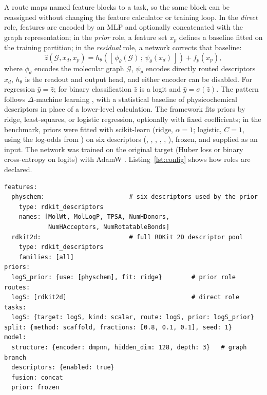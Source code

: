 A route maps named feature blocks to a task, so the same block can be reassigned without changing the feature calculator or training loop. In the \emph{direct} role, features are encoded by an MLP and optionally concatenated with the graph representation; in the \emph{prior} role, a feature set $x_p$ defines a baseline fitted on the training partition; in the \emph{residual} role, a network corrects that baseline:
\begin{equation}
    \hat{z}(\mathcal{G}, x_d, x_p) = h_\theta\!\left(\left[\,\phi_\theta(\mathcal{G})\,;\,\psi_\theta(x_d)\,\right]\right) + f_p(x_p),
    \label{eq:prior-residual}
\end{equation}
where $\phi_\theta$ encodes the molecular graph $\mathcal{G}$, $\psi_\theta$ encodes directly routed descriptors $x_d$, $h_\theta$ is the readout and output head, and either encoder can be disabled. For regression $\hat{y}=\hat{z}$; for binary classification $\hat{z}$ is a logit and $\hat{y}=\sigma(\hat{z})$. The pattern follows $\Delta$-machine learning \cite{ramakrishnan2015delta}, with a statistical baseline of physicochemical descriptors in place of a lower-level calculation. The framework fits priors by ridge, least-squares, or logistic regression, optionally with fixed coefficients; in the benchmark, priors were fitted with scikit-learn \cite{pedregosa2011sklearn} (ridge, $\alpha=1$; logistic, $C=1$, using the log-odds from ) on six descriptors (, , , , , ), frozen, and supplied as an input. The network was trained on the original target (Huber loss \cite{huber1964robust} or binary cross-entropy on logits) with AdamW \cite{loshchilov2019adamw}. Listing~\ref{lst:config} shows how roles are declared.

\begin{lstlisting}[float=t, caption={Configuration excerpt showing the three predictive roles in Eq.~\eqref{eq:prior-residual}. The excerpt is validated against the framework schema. Removing the task prior gives a direct hybrid, disabling the descriptor branch gives a prior and residual model, and setting the graph encoder to none gives a descriptor-only model.}, label={lst:config}]
features:
  physchem:                       # six descriptors used by the prior
    type: rdkit_descriptors
    names: [MolWt, MolLogP, TPSA, NumHDonors,
            NumHAcceptors, NumRotatableBonds]
  rdkit2d:                        # full RDKit 2D descriptor pool
    type: rdkit_descriptors
    families: [all]
priors:
  logS_prior: {use: [physchem], fit: ridge}        # prior role
routes:
  logS: [rdkit2d]                                  # direct role
tasks:
  logS: {target: logS, kind: scalar, route: logS, prior: logS_prior}
split: {method: scaffold, fractions: [0.8, 0.1, 0.1], seed: 1}
model:
  structure: {encoder: dmpnn, hidden_dim: 128, depth: 3}   # graph branch
  descriptors: {enabled: true}
  fusion: concat
  prior: frozen
\end{lstlisting}

